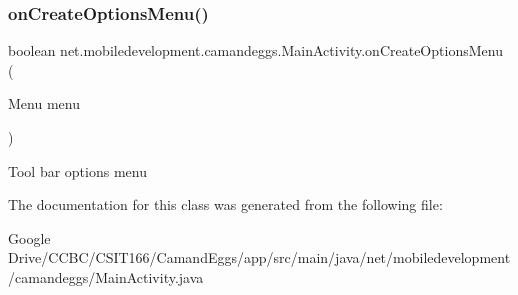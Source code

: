 \subsubsection{\texorpdfstring{on\+Create\+Options\+Menu()}{onCreateOptionsMenu()}}
{\footnotesize\ttfamily boolean net.\+mobiledevelopment.\+camandeggs.\+Main\+Activity.\+on\+Create\+Options\+Menu (\begin{DoxyParamCaption}\item[{Menu}]{menu }\end{DoxyParamCaption})}

Tool bar options menu 

The documentation for this class was generated from the following file\+:\begin{DoxyCompactItemize}
\item 
Google Drive/\+C\+C\+B\+C/\+C\+S\+I\+T166/\+Camand\+Eggs/app/src/main/java/net/mobiledevelopment/camandeggs/Main\+Activity.\+java\end{DoxyCompactItemize}
